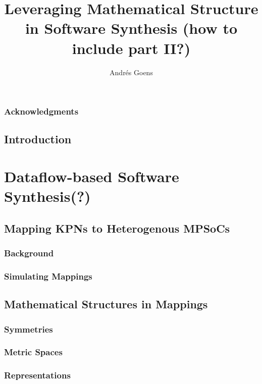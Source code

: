 \documentclass{report}
\title{Leveraging Mathematical Structure in Software Synthesis (how to include part II?)}
\author{Andr\'{e}s Goens}
\begin{document}
\date{}

\maketitle
\tableofcontents
\clearpage
\section*{Acknowledgments}


\chapter{Introduction}


\part{Dataflow-based Software Synthesis(?)}

\chapter{Mapping KPNs to Heterogenous MPSoCs}

\section{Background}

\section{Simulating Mappings}


\chapter{Mathematical Structures in Mappings}
\section{Symmetries}
\section{Metric Spaces}
\section{Representations}
%
\end{document}
